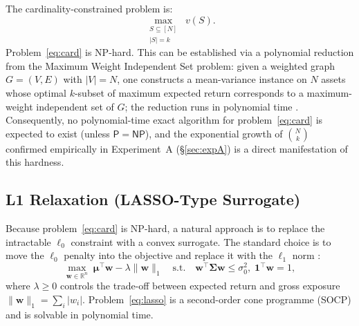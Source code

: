 \documentclass[11pt]{article}
\begin{document}
The cardinality-constrained problem is:
\begin{equation}
  \max_{\substack{S\subseteq[N] \\ |S|=k}}\; v(S).
  \label{eq:card}
\end{equation}
Problem~\eqref{eq:card} is NP-hard.  This can be established via a polynomial
reduction from the Maximum Weight Independent Set problem: given a weighted graph
$G=(V,E)$ with $|V|=N$, one constructs a mean-variance instance on $N$ assets
whose optimal $k$-subset of maximum expected return corresponds to a maximum-weight
independent set of $G$; the reduction runs in polynomial time
\cite{GareyJohnson1979}.  Consequently, no polynomial-time exact algorithm for
problem~\eqref{eq:card} is expected to exist (unless $\mathsf{P}=\mathsf{NP}$),
and the exponential growth of $\binom{N}{k}$ confirmed empirically in
Experiment~A (\S\ref{sec:expA}) is a direct manifestation of this hardness.

\subsection{L1 Relaxation (LASSO-Type Surrogate)}
\label{sec:lasso_theory}

Because problem~\eqref{eq:card} is NP-hard, a natural approach is to replace
the intractable $\ell_0$ constraint with a convex surrogate.  The standard choice
is to move the $\ell_0$ penalty into the objective and replace it with the $\ell_1$
norm \cite{Tibshirani1996}:
\begin{equation}
  \max_{\mathbf{w}\in\mathbb{R}^n}\;
    \boldsymbol{\mu}^\top\mathbf{w} - \lambda\|\mathbf{w}\|_1
  \quad\text{s.t.}\quad
  \mathbf{w}^\top\boldsymbol{\Sigma}\mathbf{w}\leq\sigma_0^2,\;
  \mathbf{1}^\top\mathbf{w}=1,
  \label{eq:lasso}
\end{equation}
where $\lambda\geq 0$ controls the trade-off between expected return and gross
exposure $\|\mathbf{w}\|_1 = \sum_i|w_i|$.  Problem~\eqref{eq:lasso} is a
second-order cone programme (SOCP) and is solvable in polynomial time.
\end{document}
